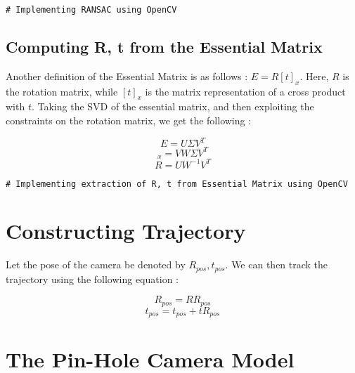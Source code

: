 \documentclass[a4paper,12pt]{extarticle}
\theoremstyle{mytheor}
\begin{document}
\begin{lstlisting}
# Implementing RANSAC using OpenCV
\end{lstlisting}

\subsection{Computing R, t from the Essential Matrix}

Another definition of the Essential Matrix is as follows : $ E = R[t]_x $. Here, $ R $ is the rotation matrix, while $ [t]_x $ is the matrix representation of a cross product with $ t $. Taking the SVD of the essential matrix, and then exploiting the constraints on the rotation matrix, we get the following : \newline

\begin{equation}
E = U \Sigma V^{T}
\end{equation}
\begin{equation}
[t]_x = V W \Sigma V^{T}
\end{equation}
\begin{equation}
R = U W^{-1} V^{T}
\end{equation}

\begin{lstlisting}
# Implementing extraction of R, t from Essential Matrix using OpenCV

\end{lstlisting}

\section{Constructing Trajectory}

Let the pose of the camera be denoted by $ R_{pos}, t_{pos} $. We can then track the trajectory using the following equation :
\newline

\begin{equation}
R_{pos} = RR_{pos} 
\end{equation}
\begin{equation}
t_{pos} = t_{pos} + t R_{pos}
\end{equation}


\newpage

\section{The Pin-Hole Camera Model}
\end{document}
